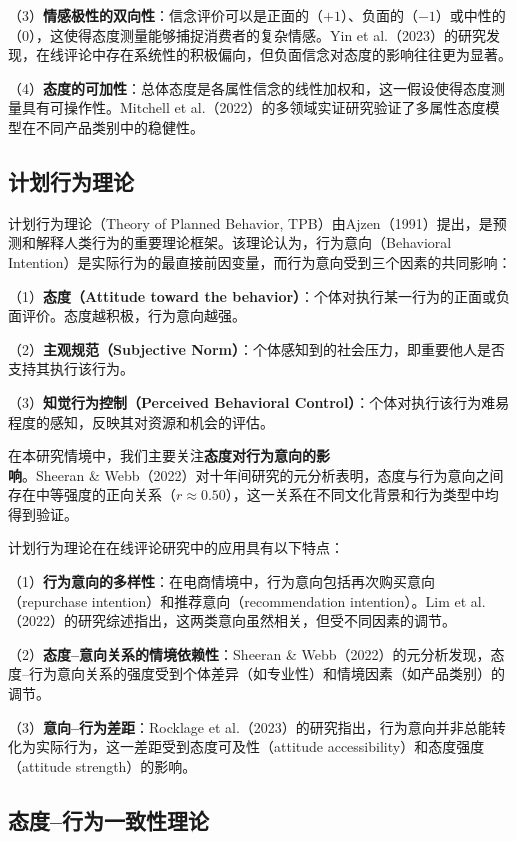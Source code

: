 （3）\textbf{情感极性的双向性}：信念评价可以是正面的（$+1$）、负面的（$-1$）或中性的（$0$），这使得态度测量能够捕捉消费者的复杂情感。Yin et al.（2023）\cite{yin2023}的研究发现，在线评论中存在系统性的积极偏向，但负面信念对态度的影响往往更为显著。

（4）\textbf{态度的可加性}：总体态度是各属性信念的线性加权和，这一假设使得态度测量具有可操作性。Mitchell et al.（2022）\cite{mitchell2022}的多领域实证研究验证了多属性态度模型在不同产品类别中的稳健性。

\subsection{计划行为理论}

计划行为理论（Theory of Planned Behavior, TPB）由Ajzen（1991）\cite{ajzen1991}提出，是预测和解释人类行为的重要理论框架。该理论认为，行为意向（Behavioral Intention）是实际行为的最直接前因变量，而行为意向受到三个因素的共同影响：

（1）\textbf{态度（Attitude toward the behavior）}：个体对执行某一行为的正面或负面评价。态度越积极，行为意向越强。

（2）\textbf{主观规范（Subjective Norm）}：个体感知到的社会压力，即重要他人是否支持其执行该行为。

（3）\textbf{知觉行为控制（Perceived Behavioral Control）}：个体对执行该行为难易程度的感知，反映其对资源和机会的评估。

在本研究情境中，我们主要关注\textbf{态度对行为意向的影响}。Sheeran \& Webb（2022）\cite{sheeran2022}对十年间研究的元分析表明，态度与行为意向之间存在中等强度的正向关系（$r \approx 0.50$），这一关系在不同文化背景和行为类型中均得到验证。

计划行为理论在在线评论研究中的应用具有以下特点：

（1）\textbf{行为意向的多样性}：在电商情境中，行为意向包括再次购买意向（repurchase intention）和推荐意向（recommendation intention）。Lim et al.（2022）\cite{lim2022}的研究综述指出，这两类意向虽然相关，但受不同因素的调节。

（2）\textbf{态度--意向关系的情境依赖性}：Sheeran \& Webb（2022）\cite{sheeran2022}的元分析发现，态度--行为意向关系的强度受到个体差异（如专业性）和情境因素（如产品类别）的调节。

（3）\textbf{意向--行为差距}：Rocklage et al.（2023）\cite{rocklage2023}的研究指出，行为意向并非总能转化为实际行为，这一差距受到态度可及性（attitude accessibility）和态度强度（attitude strength）的影响。

\subsection{态度--行为一致性理论}

